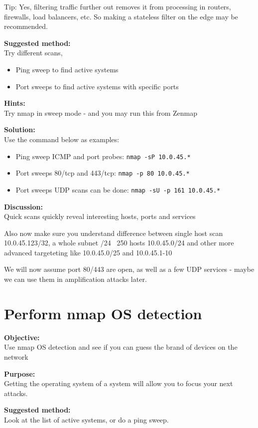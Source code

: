 \documentclass[a4paper,11pt,notitlepage]{report}
\begin{document}
Tip: Yes, filtering traffic further out removes it from processing in routers, firewalls, load balancers, etc. So making a stateless filter on the edge may be recommended.

{\bf Suggested method:}\\
Try different scans,
\begin{itemize}
\item Ping sweep to find active systems
\item Port sweeps to find active systems with specific ports
\end{itemize}

{\bf Hints:} \\
Try nmap in sweep mode - and you may run this from Zenmap

{\bf Solution:}\\
Use the command below as examples:
\begin{itemize}
\item Ping sweep ICMP and port probes: \verb+nmap -sP 10.0.45.*+
\item Port sweeps 80/tcp and 443/tcp: \verb+nmap -p 80 10.0.45.*+
\item Port sweeps UDP scans can be done: \verb+nmap -sU -p 161 10.0.45.*+
\end{itemize}

{\bf Discussion:}\\
Quick scans quickly reveal interesting hosts, ports and services

Also now make sure you understand difference between single host scan
10.0.45.123/32, a whole subnet /24 ~250 hosts 10.0.45.0/24 and other more advanced targeteting like 10.0.45.0/25 and 10.0.45.1-10

We will now assume port 80/443 are open, as well as a few UDP services - maybe we can use them in amplification attacks later.



\chapter{Perform nmap OS detection}
\label{ex:nmap-os}

{\bf Objective:} \\
Use nmap OS detection and see if you can guess the brand of devices on the network

{\bf Purpose:}\\
Getting the operating system of a system will allow you to focus your next attacks.

{\bf Suggested method:}\\
Look at the list of active systems, or do a ping sweep.
\end{document}
